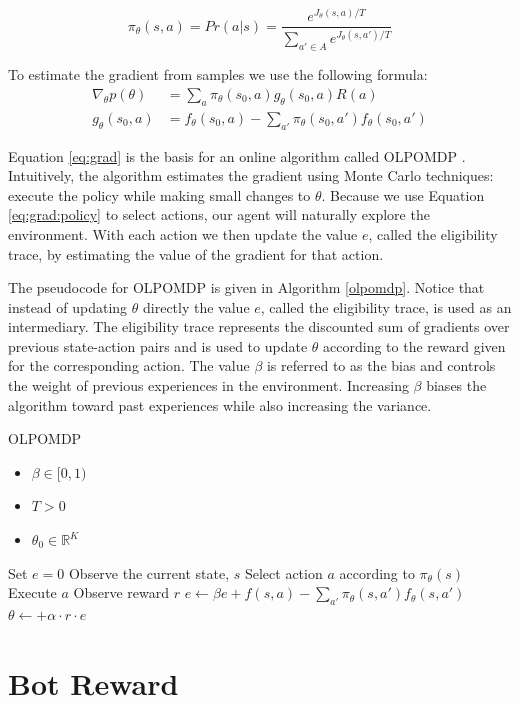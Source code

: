 \begin{equation}
\label{eq:grad:policy}
    \pi_\theta(s,a) = Pr(a|s) = \frac{e^{J_\theta(s,a)/T}}{\sum\limits_{a'\in A} e^{J_\theta(s,a')/T}}
\end{equation}

To estimate the gradient from samples we use the following formula:
\begin{equation}
\label{eq:grad}
    \begin{aligned}
        \nabla_\theta p(\theta) &= \sum_a\pi_\theta(s_0,a)g_\theta(s_0,a)R(a) \\
        g_\theta(s_0,a) &= f_\theta(s_0, a) - \sum\limits_{a'} \pi_\theta(s_0,a')f_\theta(s_0,a')
    \end{aligned}
\end{equation}

Equation \ref{eq:grad} is the basis for an online algorithm called OLPOMDP \cite{olpomdp}. Intuitively, the algorithm estimates the gradient using Monte Carlo techniques: execute the policy while making small changes to $\theta$. Because we use Equation \ref{eq:grad:policy} to select actions, our agent will naturally explore the environment. With each action we then update the value $e$, called the eligibility trace, by estimating the value of the gradient for that action.

The pseudocode for OLPOMDP is given in Algorithm \ref{olpomdp}. Notice that instead of updating $\theta$ directly the value $e$, called the eligibility trace, is used as an intermediary. The eligibility trace represents the discounted sum of gradients over previous state-action pairs and is used to update $\theta$ according to the reward given for the corresponding action. The value $\beta$ is referred to as the bias and controls the weight of previous experiences in the environment. Increasing $\beta$ biases the algorithm toward past experiences while also increasing the variance. 

\begin{algorithm}
\caption{OLPOMDP}
\label{olpomdp}
    {\fontsize{12}{10}\selectfont
    \begin{algorithmic}[1]
        \REQUIRE
            \begin{itemize} 
                \item $\beta \in [0,1)$ 
                \item $T > 0$ 
                \item $\theta_0 \in \mathbb{R}^K$ 
            \end{itemize}
    \STATE Set $e = 0$
        \STATE Observe the current state, $s$
        \STATE Select action $a$ according to $\pi_\theta(s)$
        \STATE Execute $a$
        \STATE Observe reward $r$
        \STATE $e \leftarrow \beta e + f(s,a) - \sum\limits_{a'}\pi_\theta(s,a')f_\theta(s,a')$
        \STATE $\theta \leftarrow + \alpha \cdot r \cdot e$
    \ENDFOR
    \end{algorithmic}
    }
\end{algorithm}

\section{Bot Reward}